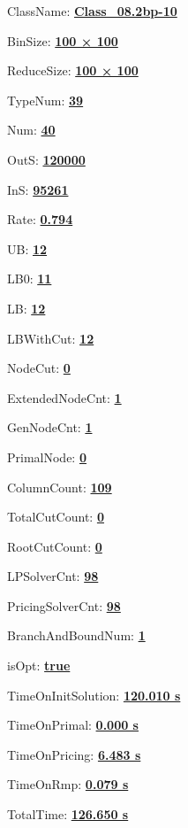 \documentclass[11pt]{article}
\begin{document}
\pagestyle{empty}


ClassName: \underline{\textbf{Class_08.2bp-10}}
\par
BinSize: \underline{\textbf{100 × 100}}
\par
ReduceSize: \underline{\textbf{100 × 100}}
\par
TypeNum: \underline{\textbf{39}}
\par
Num: \underline{\textbf{40}}
\par
OutS: \underline{\textbf{120000}}
\par
InS: \underline{\textbf{95261}}
\par
Rate: \underline{\textbf{0.794}}
\par
UB: \underline{\textbf{12}}
\par
LB0: \underline{\textbf{11}}
\par
LB: \underline{\textbf{12}}
\par
LBWithCut: \underline{\textbf{12}}
\par
NodeCut: \underline{\textbf{0}}
\par
ExtendedNodeCnt: \underline{\textbf{1}}
\par
GenNodeCnt: \underline{\textbf{1}}
\par
PrimalNode: \underline{\textbf{0}}
\par
ColumnCount: \underline{\textbf{109}}
\par
TotalCutCount: \underline{\textbf{0}}
\par
RootCutCount: \underline{\textbf{0}}
\par
LPSolverCnt: \underline{\textbf{98}}
\par
PricingSolverCnt: \underline{\textbf{98}}
\par
BranchAndBoundNum: \underline{\textbf{1}}
\par
isOpt: \underline{\textbf{true}}
\par
TimeOnInitSolution: \underline{\textbf{120.010 s}}
\par
TimeOnPrimal: \underline{\textbf{0.000 s}}
\par
TimeOnPricing: \underline{\textbf{6.483 s}}
\par
TimeOnRmp: \underline{\textbf{0.079 s}}
\par
TotalTime: \underline{\textbf{126.650 s}}
\par
\newpage


\end{document}
